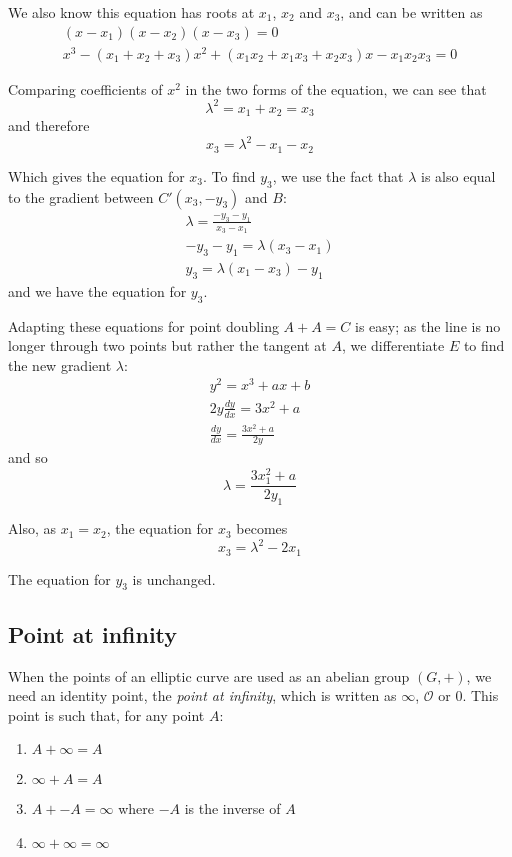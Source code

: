 \documentclass[a4paper]{article}
\begin{document}
We also know this equation has roots at $x_1$, $x_2$ and $x_3$, and can be written as
\begin{align*}
    (x-x_1)(x-x_2)(x-x_3)=0 \\
    x^3 - (x_1 + x_2 + x_3)x^2 + (x_1x_2 + x_1x_3 + x_2x_3)x - x_1x_2x_3 = 0
\end{align*}

Comparing coefficients of $x^2$ in the two forms of the equation, we can see that \[\lambda^2 = x_1 + x_2 = x_3\] and therefore \[x_3 = \lambda^2 - x_1 - x_2\]

Which gives the equation for $x_3$. To find $y_3$, we use the fact that $\lambda$ is also equal to the gradient between $C'(x_3, -y_3)$ and $B$:
\begin{align*}
    \lambda = \frac{-y_3-y_1}{x_3-x_1} \\
    -y_3 - y_1 = \lambda(x_3-x_1) \\
    y_3 = \lambda(x_1-x_3)-y_1
\end{align*}
and we have the equation for $y_3$.

Adapting these equations for point doubling $A + A = C$ is easy; as the line is no longer through two points but rather the tangent at $A$, we differentiate $E$ to find the new gradient $\lambda$:
\begin{align*}
    y^2 = x^3 + ax + b \\
    2y\frac{dy}{dx} = 3x^2 + a \\
    \frac{dy}{dx} = \frac{3x^2 + a}{2y}
\end{align*}
and so \[\lambda = \frac{3x_1^2 + a}{2y_1}\]

Also, as $x_1 = x_2$, the equation for $x_3$ becomes \[x_3 = \lambda^2-2x_1\]

The equation for $y_3$ is unchanged.

\subsection{Point at infinity}

When the points of an elliptic curve are used as an abelian group $(G, +)$, we need an identity point, the \textit{point at infinity}, which is written as $\infty$, $\mathcal{O}$ or $0$. This point is such that, for any point $A$:

\begin{enumerate}
    \item $A + \infty = A$
    \item $\infty + A = A$
    \item $A + -A = \infty$ where $-A$ is the inverse of $A$
    \item $\infty + \infty = \infty$
\end{enumerate}
\end{document}
